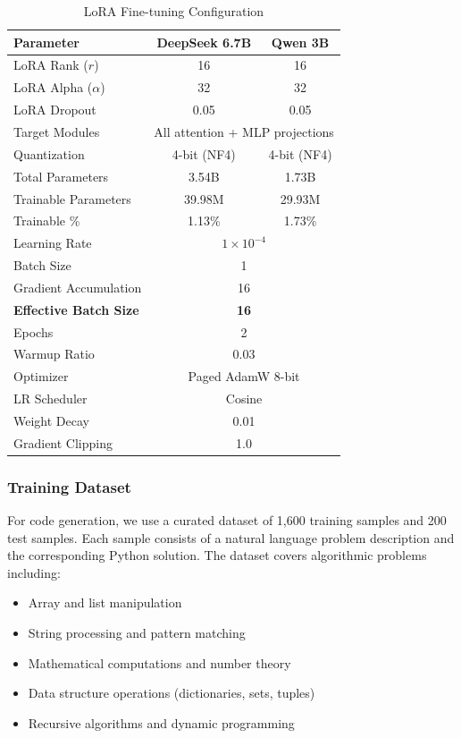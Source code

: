 \documentclass[conference]{IEEEtran}
\begin{document}
\begin{table}[htbp]
\caption{LoRA Fine-tuning Configuration}
\begin{center}
\begin{tabular}{|l|c|c|}
\hline
\textbf{Parameter} & \textbf{DeepSeek 6.7B} & \textbf{Qwen 3B} \\
\hline
LoRA Rank ($r$) & 16 & 16 \\
LoRA Alpha ($\alpha$) & 32 & 32 \\
LoRA Dropout & 0.05 & 0.05 \\
Target Modules & \multicolumn{2}{c|}{All attention + MLP projections} \\
Quantization & 4-bit (NF4) & 4-bit (NF4) \\
Total Parameters & 3.54B & 1.73B \\
Trainable Parameters & 39.98M & 29.93M \\
Trainable \% & 1.13\% & 1.73\% \\
\hline
Learning Rate & \multicolumn{2}{c|}{$1 \times 10^{-4}$} \\
Batch Size & \multicolumn{2}{c|}{1} \\
Gradient Accumulation & \multicolumn{2}{c|}{16} \\
\textbf{Effective Batch Size} & \multicolumn{2}{c|}{\textbf{16}} \\
Epochs & \multicolumn{2}{c|}{2} \\
Warmup Ratio & \multicolumn{2}{c|}{0.03} \\
Optimizer & \multicolumn{2}{c|}{Paged AdamW 8-bit} \\
LR Scheduler & \multicolumn{2}{c|}{Cosine} \\
Weight Decay & \multicolumn{2}{c|}{0.01} \\
Gradient Clipping & \multicolumn{2}{c|}{1.0} \\
\hline
\end{tabular}
\label{tab:lora_config}
\end{center}
\end{table}

\subsubsection{Training Dataset}
For code generation, we use a curated dataset of 1,600 training samples and 200 test samples. Each sample consists of a natural language problem description and the corresponding Python solution. The dataset covers algorithmic problems including:

\begin{itemize}
    \item Array and list manipulation
    \item String processing and pattern matching
    \item Mathematical computations and number theory
    \item Data structure operations (dictionaries, sets, tuples)
    \item Recursive algorithms and dynamic programming
\end{itemize}
\end{document}
